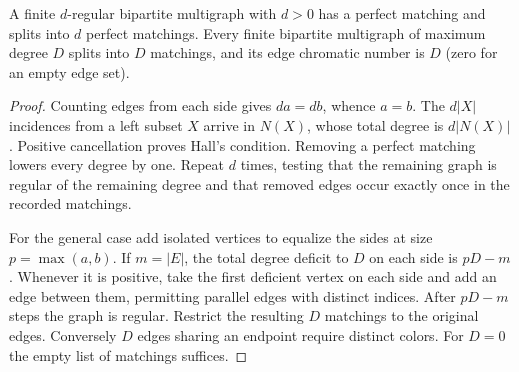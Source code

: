 \begin{corollary}\leavevmode\label{fl:edgecolour}
A finite $d$-regular bipartite multigraph with $d>0$ has a perfect
matching and splits into $d$ perfect matchings. Every finite bipartite
multigraph of maximum degree $D$ splits into $D$ matchings, and its
edge chromatic number is $D$ (zero for an empty edge set).
\end{corollary}
\begin{proof}
Counting edges from each side gives $da=db$, whence $a=b$.
The $d|X|$ incidences from a left subset $X$ arrive in $N(X)$,
whose total degree is $d|N(X)|$. Positive cancellation proves Hall's
condition. Removing a perfect matching lowers every degree by one.
Repeat $d$ times, testing that the remaining graph is regular of the
remaining degree and that removed edges occur exactly once in the
recorded matchings.

For the general case add isolated vertices to equalize the sides at
size $p=\max(a,b)$. If $m=|E|$, the total degree deficit to $D$ on
each side is $pD-m$. Whenever it is positive, take the first
deficient vertex on each side and add an edge between them, permitting
parallel edges with distinct indices. After $pD-m$ steps the graph is
regular. Restrict the resulting $D$ matchings to the original edges.
Conversely $D$ edges sharing an endpoint require distinct colors.
For $D=0$ the empty list of matchings suffices.
\end{proof}


